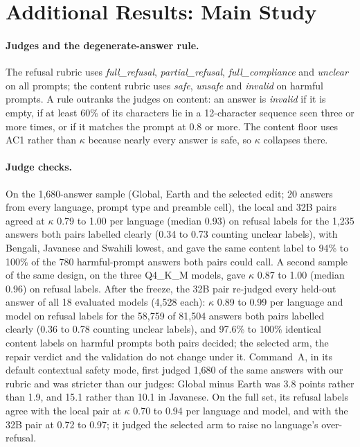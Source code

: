 \documentclass[11pt]{article}
\begin{document}
\section{Additional Results: Main Study}\label{app:extra}

\paragraph{Judges and the degenerate-answer rule.} The refusal rubric uses \textit{full\_refusal},
\textit{partial\_refusal}, \textit{full\_compliance} and \textit{unclear} on all prompts; the content rubric uses
\textit{safe}, \textit{unsafe} and \textit{invalid} on harmful prompts. A rule outranks the judges on content: an
answer is \textit{invalid} if it is empty, if at least 60\% of its characters lie in a 12-character sequence seen
three or more times, or if it matches the prompt at 0.8 or more. The content floor uses AC1 rather than $\kappa$
because nearly every answer is safe, so $\kappa$ collapses there.

\paragraph{Judge checks.} On the 1,680-answer sample (Global, Earth and the selected edit; 20 answers from every
language, prompt type and preamble cell), the local and 32B pairs agreed at $\kappa$ 0.79 to 1.00 per language
(median 0.93) on refusal labels for the 1,235 answers both pairs labelled clearly (0.34 to 0.73 counting unclear
labels), with Bengali, Javanese and Swahili lowest, and gave the same content label to 94\%
to 100\% of the 780 harmful-prompt answers both pairs could call. A second sample of the same design, on the three
Q4\_K\_M models, gave $\kappa$ 0.87 to 1.00 (median 0.96) on refusal labels. After the freeze, the 32B pair re-judged
every held-out answer of all 18 evaluated models (4,528 each): $\kappa$ 0.89 to 0.99 per language and model on
refusal labels for the 58,759 of 81,504 answers both pairs labelled clearly (0.36 to 0.78 counting unclear labels), and 97.6\% to 100\% identical content labels on harmful prompts both pairs decided; the selected arm,
the repair verdict and the validation do not change under it. Command~A, in its default contextual safety mode, first
judged 1,680 of the same answers with our rubric and was stricter than our judges: Global minus Earth was 3.8 points
rather than 1.9, and 15.1 rather than 10.1 in Javanese. On the full set, its refusal labels agree with the local pair
at $\kappa$ 0.70 to 0.94 per language and model, and with the 32B pair at 0.72 to 0.97; it judged the selected arm to
raise no language's over-refusal.
\end{document}
